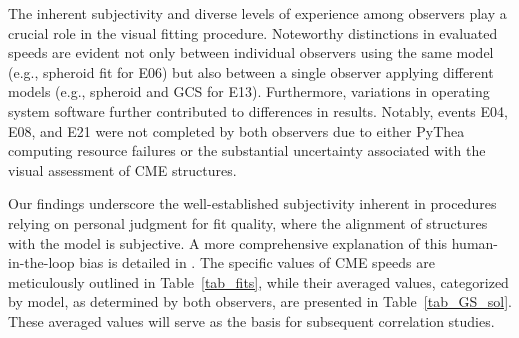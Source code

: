 The inherent subjectivity and diverse levels of experience among observers play a crucial role in the visual fitting procedure. Noteworthy distinctions in evaluated speeds are evident not only between individual observers using the same model (e.g., spheroid fit for E06) but also between a single observer applying different models (e.g., spheroid and GCS for E13). Furthermore, variations in operating system software further contributed to differences in results. Notably, events E04, E08, and E21 were not completed by both observers due to either PyThea computing resource failures or the substantial uncertainty associated with the visual assessment of CME structures.

Our findings underscore the well-established subjectivity inherent in procedures relying on personal judgment for fit quality, where the alignment of structures with the model is subjective. A more comprehensive explanation of this human-in-the-loop bias is detailed in \citep{verbeke_2022}. The specific values of CME speeds are meticulously outlined in Table~\ref{tab_fits}, while their averaged values, categorized by model, as determined by both observers, are presented in Table~\ref{tab_GS_sol}. These averaged values will serve as the basis for subsequent correlation studies.
	
